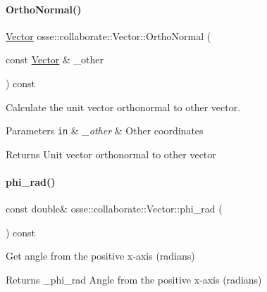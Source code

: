 \paragraph{\texorpdfstring{Ortho\+Normal()}{OrthoNormal()}}
{\footnotesize\ttfamily \hyperlink{classosse_1_1collaborate_1_1_vector}{Vector} osse\+::collaborate\+::\+Vector\+::\+Ortho\+Normal (\begin{DoxyParamCaption}\item[{const \hyperlink{classosse_1_1collaborate_1_1_vector}{Vector} \&}]{\+\_\+other }\end{DoxyParamCaption}) const}



Calculate the unit vector orthonormal to other vector. 


\begin{DoxyParams}[1]{Parameters}
\mbox{\tt in}  & {\em \+\_\+other} & Other coordinates \\
\hline
\end{DoxyParams}
\begin{DoxyReturn}{Returns}
Unit vector orthonormal to other vector 
\end{DoxyReturn}
\mbox{\label{classosse_1_1collaborate_1_1_vector_a616314b8bb82923b6bc689bd8af88552}} 
\paragraph{\texorpdfstring{phi\+\_\+rad()}{phi\_rad()}}
{\footnotesize\ttfamily const double\& osse\+::collaborate\+::\+Vector\+::phi\+\_\+rad (\begin{DoxyParamCaption}{ }\end{DoxyParamCaption}) const\hspace{0.3cm}{\ttfamily [inline]}}



Get angle from the positive x-\/axis (radians) 

\begin{DoxyReturn}{Returns}
\+\_\+phi\+\_\+rad Angle from the positive x-\/axis (radians) 
\end{DoxyReturn}
\mbox{\label{classosse_1_1collaborate_1_1_vector_a43ab316f8ed0dce4dc6006c80ea97987}} 
